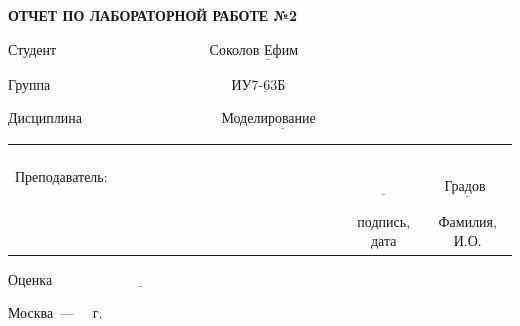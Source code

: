 \begin{titlepage}
	
	\begin{center}
		\noindent\begin{minipage}{1.2\textwidth}\centering
			\textbf{ОТЧЕТ ПО ЛАБОРАТОРНОЙ РАБОТЕ №2}\newline\newline\newline
		\end{minipage}
	\end{center}

	\noindent Студент $\underline{\text{~~~~~~~~~~~~~~~~~~~~~~~~~~~~~~~~Соколов Ефим~~~~~~~~~~~~~~~~~~~~~~~~~~~~~~~~~~~~~~}}$
	
	\noindent Группа $\underline{\text{~~~~~~~~~~~~~~~~~~~~~~~~~~~~~~~~~~~~~~ИУ7-63Б~~~~~~~~~~~~~~~~~~~~~~~~~~~~~~~~~~~~~~~~~}}$
	
	\noindent Дисциплина $\underline{\text{~~~~~~~~~~~~~~~~~~~~~~~~~~~~~Моделирование~~~~~~~~~~~~~~~~~~~~~~~~~~~~~~~~~~~}}$\newline
	
	
	\noindent\begin{tabular}{lcc}
		&&\\
		&&\\
		&&\\
		&&\\
		Преподаватель: ~~~~~~~~~~~~~~~~~~~~~~~~~~~~~~~~~~~~~~~~~& $\underline{\text{~~~~~~~~~~~~}}$ & $\underline{\text{~~~Градов В.М.~~~}}$ \\
		& \footnotesize подпись, дата & \footnotesize Фамилия, И.О. \\
	\end{tabular}
	\newline\newline\newline
	\noindent Оценка $\underline{\text{~~~~~~~~~~~~~~~~~~~~~~~~~~~~~~~~~~~~}}$
	
	
	\begin{center}
		\vfill
		Москва~---~\the\year
		~г.
	\end{center}
 \restoregeometry
\end{titlepage}
